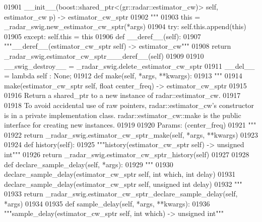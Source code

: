 \begin{DoxyCode}
{{{{{{{{01901 \textcolor{stringliteral}{        \_\_init\_\_(boost::shared\_ptr<(gr::radar::estimator\_cw)> self, estimator\_cw p) -> estimator\_cw\_sptr}
01902 \textcolor{stringliteral}{        """}
01903         this = \_radar\_swig.new\_estimator\_cw\_sptr(*args)
01904         \textcolor{keywordflow}{try}: self.this.append(this)
01905         \textcolor{keywordflow}{except}: self.this = this
01906     \textcolor{keyword}{def }__deref__(self):
01907         \textcolor{stringliteral}{"""\_\_deref\_\_(estimator\_cw\_sptr self) -> estimator\_cw"""}
01908         \textcolor{keywordflow}{return} \_radar\_swig.estimator\_cw\_sptr\_\_\_deref\_\_(self)
01909 
01910     \_\_swig\_destroy\_\_ = \_radar\_swig.delete\_estimator\_cw\_sptr
01911     \_\_del\_\_ = \textcolor{keyword}{lambda} self : \textcolor{keywordtype}{None};
01912     \textcolor{keyword}{def }make(self, *args, **kwargs):
01913         \textcolor{stringliteral}{"""}
01914 \textcolor{stringliteral}{        make(estimator\_cw\_sptr self, float center\_freq) -> estimator\_cw\_sptr}
01915 \textcolor{stringliteral}{}
01916 \textcolor{stringliteral}{        Return a shared\_ptr to a new instance of radar::estimator\_cw.}
01917 \textcolor{stringliteral}{}
01918 \textcolor{stringliteral}{        To avoid accidental use of raw pointers, radar::estimator\_cw's constructor is in a private
       implementation class. radar::estimator\_cw::make is the public interface for creating new instances.}
01919 \textcolor{stringliteral}{}
01920 \textcolor{stringliteral}{        Params: (center\_freq)}
01921 \textcolor{stringliteral}{        """}
01922         \textcolor{keywordflow}{return} \_radar\_swig.estimator\_cw\_sptr\_make(self, *args, **kwargs)
01923 
01924     \textcolor{keyword}{def }history(self):
01925         \textcolor{stringliteral}{"""history(estimator\_cw\_sptr self) -> unsigned int"""}
01926         \textcolor{keywordflow}{return} \_radar\_swig.estimator\_cw\_sptr\_history(self)
01927 
01928     \textcolor{keyword}{def }declare_sample_delay(self, *args):
01929         \textcolor{stringliteral}{"""}
01930 \textcolor{stringliteral}{        declare\_sample\_delay(estimator\_cw\_sptr self, int which, int delay)}
01931 \textcolor{stringliteral}{        declare\_sample\_delay(estimator\_cw\_sptr self, unsigned int delay)}
01932 \textcolor{stringliteral}{        """}
01933         \textcolor{keywordflow}{return} \_radar\_swig.estimator\_cw\_sptr\_declare\_sample\_delay(self, *args)
01934 
01935     \textcolor{keyword}{def }sample_delay(self, *args, **kwargs):
01936         \textcolor{stringliteral}{"""sample\_delay(estimator\_cw\_sptr self, int which) -> unsigned int"""}
}}}}}}}}
\end{DoxyCode}
